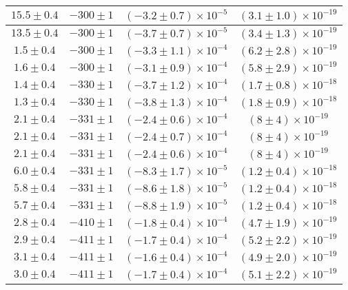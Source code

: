 \begin{longtable}[C]{|c|c|c|c|}
            \hline
            $15.5 \pm 0.4$ & $-300 \pm 1$ & $(-3.2 \pm 0.7) \times 10^{-5}$ & $(3.1 \pm 1.0) \times 10^{-19}$ \\
            \hline
            $13.5 \pm 0.4$ & $-300 \pm 1$ & $(-3.7 \pm 0.7) \times 10^{-5}$ & $(3.4 \pm 1.3) \times 10^{-19}$ \\
            \hline
            $1.5 \pm 0.4$ & $-300 \pm 1$ & $(-3.3 \pm 1.1) \times 10^{-4}$ & $(6.2 \pm 2.8) \times 10^{-19}$ \\
            \hline
            $1.6 \pm 0.4$ & $-300 \pm 1$ & $(-3.1 \pm 0.9) \times 10^{-4}$ & $(5.8 \pm 2.9) \times 10^{-19}$ \\
            \hline
            $1.4 \pm 0.4$ & $-330 \pm 1$ & $(-3.7 \pm 1.2) \times 10^{-4}$ & $(1.7 \pm 0.8) \times 10^{-18}$ \\
            \hline
            $1.3 \pm 0.4$ & $-330 \pm 1$ & $(-3.8 \pm 1.3) \times 10^{-4}$ & $(1.8 \pm 0.9) \times 10^{-18}$ \\
            \hline
            $2.1 \pm 0.4$ & $-331 \pm 1$ & $(-2.4 \pm 0.6) \times 10^{-4}$ & $(8 \pm 4) \times 10^{-19}$ \\
            \hline
            $2.1 \pm 0.4$ & $-331 \pm 1$ & $(-2.4 \pm 0.7) \times 10^{-4}$ & $(8 \pm 4) \times 10^{-19}$ \\
            \hline
            $2.1 \pm 0.4$ & $-331 \pm 1$ & $(-2.4 \pm 0.6) \times 10^{-4}$ & $(8 \pm 4) \times 10^{-19}$ \\
            \hline
            $6.0 \pm 0.4$ & $-331 \pm 1$ & $(-8.3 \pm 1.7) \times 10^{-5}$ & $(1.2 \pm 0.4) \times 10^{-18}$ \\
            \hline
            $5.8 \pm 0.4$ & $-331 \pm 1$ & $(-8.6 \pm 1.8) \times 10^{-5}$ & $(1.2 \pm 0.4) \times 10^{-18}$ \\
            \hline
            $5.7 \pm 0.4$ & $-331 \pm 1$ & $(-8.8 \pm 1.9) \times 10^{-5}$ & $(1.2 \pm 0.4) \times 10^{-18}$ \\
            \hline
            $2.8 \pm 0.4$ & $-410 \pm 1$ & $(-1.8 \pm 0.4) \times 10^{-4}$ & $(4.7 \pm 1.9) \times 10^{-19}$ \\
            \hline
            $2.9 \pm 0.4$ & $-411 \pm 1$ & $(-1.7 \pm 0.4) \times 10^{-4}$ & $(5.2 \pm 2.2) \times 10^{-19}$ \\
            \hline
            $3.1 \pm 0.4$ & $-411 \pm 1$ & $(-1.6 \pm 0.4) \times 10^{-4}$ & $(4.9 \pm 2.0) \times 10^{-19}$ \\
            \hline
            $3.0 \pm 0.4$ & $-411 \pm 1$ & $(-1.7 \pm 0.4) \times 10^{-4}$ & $(5.1 \pm 2.2) \times 10^{-19}$ \\

\end{longtable}
